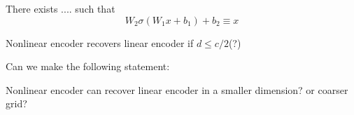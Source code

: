 \begin{lemma}
There exists .... such that  
$$
W_2\sigma (W_1x+b_1)+b_2\equiv x
$$
\end{lemma}
\begin{theorem}
Nonlinear encoder recovers linear encoder if $d\le c/2$(?) 
\end{theorem}
Can we make the following statement:
\begin{remark}
  Nonlinear encoder can recover linear encoder in a smaller dimension?
  or coarser grid?
\end{remark}
